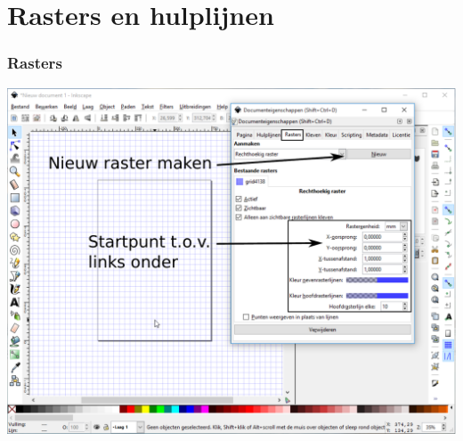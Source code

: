 \documentclass[t]{beamer}
\begin{document}
	\section{Rasters en hulplijnen}
	\begin{frame}
		\frametitle{Rasters}
		\begin{center}
			\includegraphics[height=0.8\textheight]{fig/inkscape_documenteigenschappen_rasters}
		\end{center}	
	\end{frame}
\end{document}
